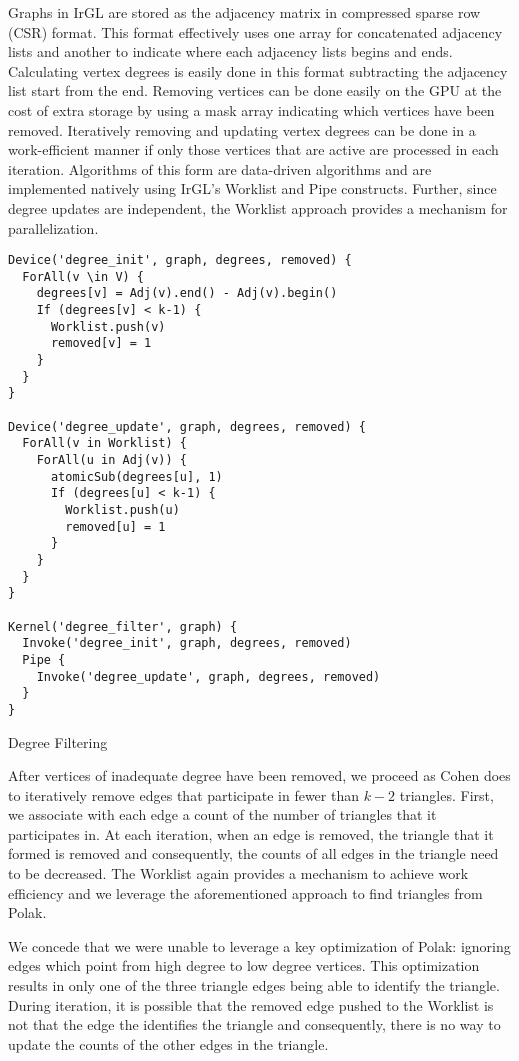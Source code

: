 Graphs in IrGL are stored as the adjacency matrix in compressed sparse row (CSR) format.
This format effectively uses one array for concatenated adjacency lists and another to indicate where each adjacency lists begins and ends.
Calculating vertex degrees is easily done in this format subtracting the adjacency list start from the end.
Removing vertices can be done easily on the GPU at the cost of extra storage by using a mask array indicating which vertices have been removed.
Iteratively removing and updating vertex degrees can be done in a work-efficient manner if only those vertices that are active are processed in each iteration.
Algorithms of this form are data-driven algorithms \cite{pingali2011galois} and are implemented natively using IrGL's Worklist and Pipe constructs.
Further, since degree updates are independent, the Worklist approach provides a mechanism for parallelization.


\begin{listing}
\begin{verbatim}
Device('degree_init', graph, degrees, removed) {
  ForAll(v \in V) {
    degrees[v] = Adj(v).end() - Adj(v).begin()
    If (degrees[v] < k-1) {
      Worklist.push(v)
      removed[v] = 1
    }
  }
}

Device('degree_update', graph, degrees, removed) {
  ForAll(v in Worklist) {
    ForAll(u in Adj(v)) {
      atomicSub(degrees[u], 1)
      If (degrees[u] < k-1) {
        Worklist.push(u)
        removed[u] = 1
      }
    }
  }
}

Kernel('degree_filter', graph) {
  Invoke('degree_init', graph, degrees, removed)
  Pipe {
    Invoke('degree_update', graph, degrees, removed)
  }
}
\end{verbatim}
\caption{Degree Filtering}
\label{l:degree_filter}
\end{listing}

After vertices of inadequate degree have been removed, we proceed as Cohen does to iteratively remove edges that participate in fewer than $k-2$ triangles.
First, we associate with each edge a count of the number of triangles that it participates in.
At each iteration, when an edge is removed, the triangle that it formed is removed and consequently, the counts of all edges in the triangle need to be decreased.
The Worklist again provides a mechanism to achieve work efficiency and we leverage the aforementioned approach to find triangles from Polak.

We concede that we were unable to leverage a key optimization of Polak: ignoring edges which point from high degree to low degree vertices.
This optimization results in only one of the three triangle edges being able to identify the triangle.
During iteration, it is possible that the removed edge pushed to the Worklist is not that the edge the identifies the triangle and consequently, there is no way to update the counts of the other edges in the triangle.

